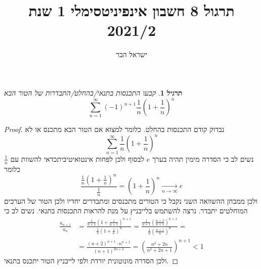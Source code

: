 \documentclass{article}
\begin{document}
\title{תרגול 8 חשבון אינפיניטסימלי 1 שנת 2021/2}
\author{ישראל הבר}
\maketitle

\newtheorem{theorem}{משפט}
\newtheorem{exercise}{תרגיל}
\newtheorem{homeexercise}{תרגיל לבית}
\newtheorem{example}{דוגמה}
\theoremstyle{definition}
\newtheorem{definition}{הגדרה}
\newtheorem{notation}{סימון}
\newtheorem{claim}{טענה}
\newtheorem{comment}{\emph{הערה}}
\renewcommand\qedsymbol{$\blacksquare$}
\newcommand{\limtoinfty}{\underset{n\rightarrow\infty}{\lim}}
\newcommand{\limtur}{\overset{\infty}{\underset{n=1}{\sum}}}
\newcommand{\limturstart}[1]{\overset{\infty}{\underset{n=#1}{\sum}}}
\newcommand{\limsuptoinfty}{\underset{n\rightarrow\infty}{\limsup}}
\newcommand{\liminftoinfty}{\underset{n\rightarrow\infty}{\liminf}}
\newcommand{\limtoinftym}{\underset{m\rightarrow\infty}{\lim}}
\newcommand{\limtop}{\underset{-}{\lim}}
\newcommand{\limbottom}{\overset{-}{\lim}}
\newcommand{\goesto}{\underset{n\rightarrow\infty}{\longrightarrow}}
\newcommand{\goestom}{\underset{m\rightarrow\infty}{\longrightarrow}}
\newcommand{\goesfrom}{\underset{n\rightarrow\infty}{\longleftarrow}}
\newcommand{\funclim}[2]{\underset{#1\rightarrow#2}{\lim}}
\newcommand{\series}[2]{\{#1\}_{#2\in\mathbb{N}}}

\begin{exercise}
קבעו התכנסות בתנאי/בהחלט/התבדרות של הטור הבא
\[\limtur (-1)^{n+1}\frac{1}{n}\left(1+\frac{1}{n}\right)^n\]
\end{exercise}

\begin{proof}
נבדוק קודם התכנסות בהחלט. כלומר למצוא אם הטור הבא מתכנס או לא
\[\limtur \frac{1}{n}\left(1+\frac{1}{n}\right)^n\]
נשים לב כי הסדרה מימין תהיה בערך 
$e$
לבסוף ולכן לפחות אינטואיטיביתכדאי להשוות עם 
$\frac{1}{n}$
כלומר 
\[\frac{\frac{1}{n}\left(1+\frac{1}{n}\right)^n}{\frac{1}{n}}=\left(1+\frac{1}{n}\right)^n\goesto e\]
ולכן ממבחן ההשוואה השני נקבל כי הטורים מתכנסים ומתבדרים יחדיו ולכן הטור של הערכים המוחלטים יתבדר. נרצה להשתמש בלייבניץ על מנת להראות התכנסות בתנאי. נשים לב כי
\begin{align*}
\frac{a_{n+1}}{a_n} &= \frac{\frac{1}{n+1}\left(1+\frac{1}{n+1}\right)^{n+1}}{\frac{1}{n}\left(1+\frac{1}{n}\right)^n} = \frac{\frac{1}{n+1}\left(\frac{n+2}{n+1}\right)^{n+1}}{\frac{1}{n}\left(\frac{n+1}{n}\right)^n} = \\ &= \frac{(n+2)^{n+1}\cdot n^{n+1}}{(n+1)^{2n+2}} = \left(\frac{n^2+2n}{n^2+2n+1}\right)^{n+1}<1
\end{align*}
ולכן הסדרה מונוטונית יורדת ולפי לייבניץ הטור יתכנס בתנאי.
\end{proof}
\end{document}
